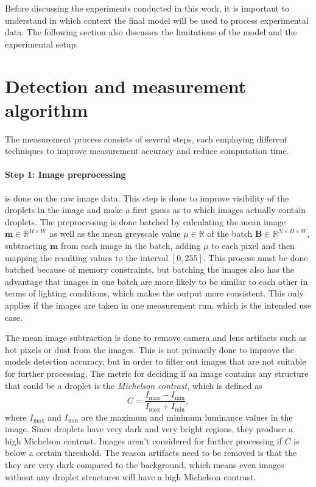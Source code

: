 Before discussing the experiments conducted in this work, it is important to understand in which context the final model will be used to process experimental data. The following section also discusses the limitations of the model and the experimental setup.

\section{Detection and measurement algorithm}
\label{sec:algorithm}

The measurement process consists of several steps, each employing different techniques to improve measurement accuracy and reduce computation time.

\paragraph{Step 1: Image preprocessing} is done on the raw image data. This step is done to improve visibility of the droplets in the image and make a first guess as to which images actually contain droplets. 
The preprocessing is done batched by calculating the mean image $\mathbf{m}\in\mathbb{R}^{H\times W}$ as well as the mean greyscale value $\mu\in\mathbb{R}$ of the batch $\mathbf{B}\in\mathbb{R}^{N\times H\times W}$, subtracting $\mathbf{m}$ from each image in the batch, adding $\mu$ to each pixel and then mapping the resulting values to the interval $[0,255]$.
This process must be done batched because of memory constraints, but batching the images also has the advantage that images in one batch are more likely to be similar to each other in terms of lighting conditions, which makes the output more consistent.
This only applies if the images are taken in one measurement run, which is the intended use case.

The mean image subtraction is done to remove camera and lens artifacts such as hot pixels or dust from the images.
This is not primarily done to improve the models detection accuracy, but in order to filter out images that are not suitable for further processing.
The metric for deciding if an image contains any structure that could be a droplet is the \emph{Michelson contrast}, which is defined as 
$$
    C = \frac{I_\text{max}-I_\text{min}}{I_\text{max}+I_\text{min}},
$$
where $I_\text{max}$ and $I_\text{min}$ are the maximum and minimum luminance values in the image.
Since droplets have very dark and very bright regions, they produce a high Michelson contrast.
Images aren't considered for further processing if $C$ is below a certain threshold.
The reason artifacts need to be removed is that the they are very dark compared to the background, which means even images without any droplet structures will have a high Michelson contrast.

